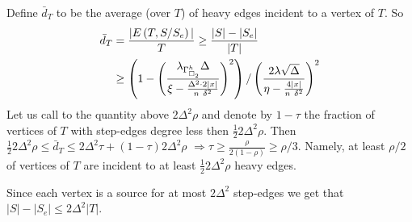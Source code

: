 \documentclass{article}
\begin{document}
\begin{multicols*}{2}
   Define $\bar{d}_{T}$ to be the average (over $T$) of heavy edges incident to a vertex of $T$. So 
    \begin{equation*}
      \begin{split}
	\bar{d}_{T} &= \frac{|E\left( T, S / S_{e} \right)|}{T} \ge \frac{|S| - |S_{e}|}{|T|} \\
	& \ge \left( 1 -   \left( \frac{ \lambda_{\Gsbh}\Delta}{\xi - \frac{\Delta^{2}\cdot 2|x|}{n\ \delta^{2}} } \right)^{2}\right) /  
	  \left( \frac{ 2\lambda\sqrt{\Delta}}{\eta - \frac{4 |x|}{n\ \delta^{2}} } \right)^{2}
      \end{split}
    \end{equation*}
    Let us call to the quantity above $2\Delta^{2}\rho$ and denote by $1 - \tau$ the fraction of vertices of $ T $ with step-edges degree less then $\frac{1}{2}2\Delta^{2}\rho$. 
    Then $ \frac{1}{2}2\Delta^{2}\rho \le \bar{d}_{T} \le 2\Delta^{2}\tau + \left( 1 - \tau \right) 2\Delta^{2}\rho  $ 
    $ \Rightarrow \tau \ge \frac{\rho}{2\left( 1 - \rho \right)}\ge \rho/3 $. Namely, at least $\rho/2$ of vertices of $T$ are incident to at least $\frac{1}{2}2\Delta^{2}\rho$ heavy edges. 

    Since each vertex is a source for at most $2\Delta^{2}$ step-edges we get that $|S| - |S_{e}| \le 2\Delta^{2}|T| $. 


\end{multicols*}
\end{document}
